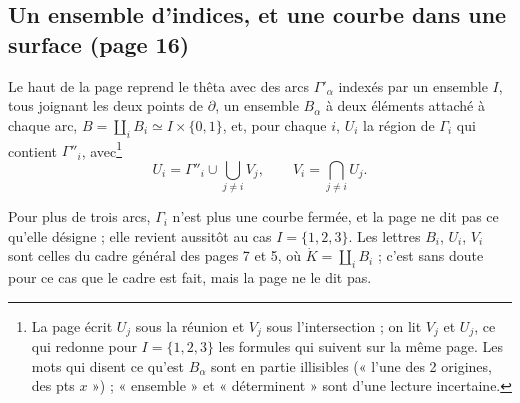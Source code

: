 \documentclass[11pt,a4paper]{article}
\begin{document}
\subsection*{Un ensemble d'indices, et une courbe dans une surface (page 16)}

Le haut de la page reprend le thêta avec des arcs $\Gamma'_\alpha$ indexés par
un ensemble $I$, tous joignant les deux points de $\partial$, un ensemble
$B_\alpha$ à deux éléments attaché à chaque arc, $B = \coprod_i B_i \simeq I
\times \{0, 1\}$, et, pour chaque $i$, $U_i$ la région de $\Gamma_i$ qui
contient $\Gamma''_i$, avec\footnote{La page écrit $U_j$ sous la réunion et
$V_j$ sous l'intersection ; on lit $V_j$ et $U_j$, ce qui redonne pour $I =
\{1, 2, 3\}$ les formules qui suivent sur la même page. Les mots qui disent ce
qu'est $B_\alpha$ sont en partie illisibles (« l'une des 2 origines, des pts
$x$ ») ; « ensemble » et « déterminent » sont d'une lecture incertaine.}
\[
U_i = \Gamma''_i \cup \bigcup_{j \neq i} V_j, \qquad
V_i = \bigcap_{j \neq i} U_j .
\]

Pour plus de trois arcs, $\Gamma_i$ n'est plus une courbe fermée, et la page ne
dit pas ce qu'elle désigne ; elle revient aussitôt au cas $I = \{1, 2, 3\}$.
Les lettres $B_i$, $U_i$, $V_i$ sont celles du cadre général des pages 7 et 5,
où $\dot{K} = \coprod_i B_i$ ; c'est sans doute pour ce cas que le cadre est
fait, mais la page ne le dit pas.
\end{document}
